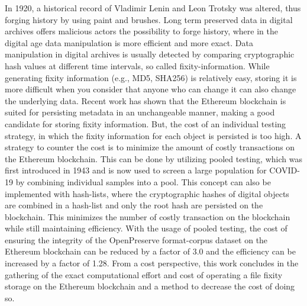In 1920, a historical record of Vladimir Lenin and Leon Trotsky was altered, thus forging history by using paint and brushes. Long term preserved data in digital archives offers malicious actors the possibility to forge history, where in the digital age data manipulation is more efficient and more exact. Data manipulation in digital archives is usually detected by comparing cryptographic hash values at different time intervals, so called fixity-information. While generating fixity information (e.g., MD5, SHA256) is relatively easy, storing it is more difficult when you consider that anyone who can change it can also change the underlying data. 
Recent work has shown that the Ethereum blockchain is suited for persisting metadata in an unchangeable manner, making a good candidate for storing fixity information. But, the cost of an individual testing strategy, in which the fixity information for each object is persisted is too high. A strategy to counter the cost is to minimize the amount of costly transactions on the Ethereum blockchain. This can be done by utilizing pooled testing, which was first introduced in 1943 and is now used to screen a large population for COVID-19 by combining individual samples into a pool. This concept can also be implemented with hash-lists, where the cryptographic hashes of digital objects are combined in a hash-list and only the root hash are persisted on the blockchain. This minimizes the number of costly transaction on the blockchain while still maintaining efficiency. With the usage of pooled testing, the cost of ensuring the integrity of the OpenPreserve format-corpus dataset on the Ethereum blockchain can be reduced by a factor of 3.0 and the efficiency can be increased by a factor of 1.28.
From a cost perspective, this work concludes in the gathering of the exact computational effort and cost of operating a file fixity storage on the Ethereum blockchain and a method to decrease the cost of doing so.

